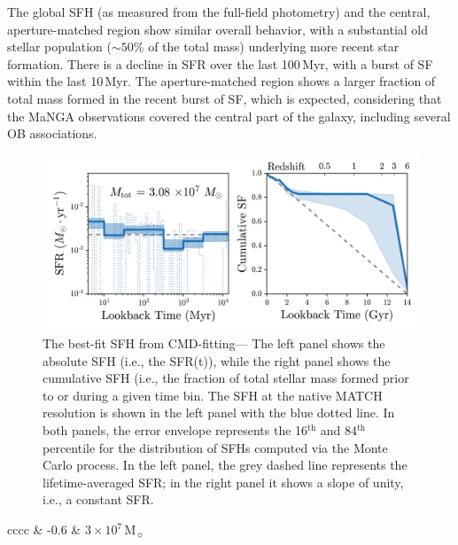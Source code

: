 \documentclass[preprint2]{aastex62}
\newcommand\Msun{\ensuremath{\,\mathrm{M_{\sun}}}\xspace}
\newcommand{\Myr}{$\,$Myr\xspace}
\begin{document}
The global SFH (as measured from the full-field photometry) and the central, aperture-matched region show similar overall behavior, with a substantial old stellar population (${\sim}50$\% of the total mass) underlying more recent star formation. There is a decline in SFR over the last 100\Myr, with a burst of SF within the last 10\Myr. The aperture-matched region shows a larger fraction of total mass formed in the recent burst of SF, which is expected, considering that the MaNGA observations covered the central part of the galaxy, including several OB associations.

\begin{figure}
  \begin{center}
    \includegraphics[width=\linewidth]{figs/f5.png}
    \caption{{\sc The best-fit SFH from CMD-fitting---} The left panel shows the absolute SFH (i.e., the SFR(t)), while the right panel shows the cumulative SFH (i.e., the fraction of total stellar mass formed prior to or during a given time bin. The SFH at the native MATCH resolution is shown in the left panel with the blue dotted line. In both panels, the error envelope represents the 16$^{\mathrm{th}}$ and 84$^{\mathrm{th}}$ percentile for the distribution of SFHs computed via the Monte Carlo process. In the left panel, the grey dashed line represents the lifetime-averaged SFR; in the right panel it shows a slope of unity, i.e., a constant SFR.}
    \label{fig:matchSFH}
  \end{center}
\end{figure}
\begin{deluxetable}{cccc}
\tablewidth{0pt}
\label{tab:matchBF}
 & -0.6 & $3\times10^{7}\Msun$ \\
\enddata
\end{deluxetable}
\end{document}
